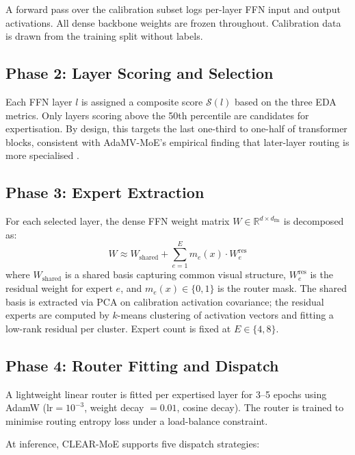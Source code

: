 \documentclass[conference]{IEEEtran}
\begin{document}
A forward pass over the calibration subset logs per-layer FFN input and output activations. All dense backbone weights are frozen throughout. Calibration data is drawn from the training split without labels.

\subsection{Phase 2: Layer Scoring and Selection}

Each FFN layer $l$ is assigned a composite score $\mathcal{S}(l)$ based on the three EDA metrics. Only layers scoring above the 50th percentile are candidates for expertisation. By design, this targets the last one-third to one-half of transformer blocks, consistent with AdaMV-MoE's empirical finding that later-layer routing is more specialised \cite{chen2023adamvmoe}.

\subsection{Phase 3: Expert Extraction}

For each selected layer, the dense FFN weight matrix $W \in \mathbb{R}^{d \times d_{\text{ffn}}}$ is decomposed as:
\begin{equation}
W \approx W_{\text{shared}} + \sum_{e=1}^{E} m_e(x) \cdot W_e^{\text{res}}
\label{eq:decomp}
\end{equation}
where $W_{\text{shared}}$ is a shared basis capturing common visual structure, $W_e^{\text{res}}$ is the residual weight for expert $e$, and $m_e(x) \in \{0, 1\}$ is the router mask. The shared basis is extracted via PCA on calibration activation covariance; the residual experts are computed by $k$-means clustering of activation vectors and fitting a low-rank residual per cluster. Expert count is fixed at $E \in \{4, 8\}$.

\subsection{Phase 4: Router Fitting and Dispatch}

A lightweight linear router is fitted per expertised layer for 3--5 epochs using AdamW ($\text{lr} = 10^{-3}$, weight decay $= 0.01$, cosine decay). The router is trained to minimise routing entropy loss under a load-balance constraint.

At inference, CLEAR-MoE supports five dispatch strategies:
\end{document}
